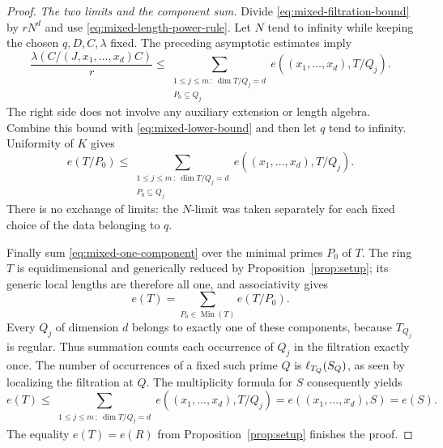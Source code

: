 \begin{proof}
\medskip
\noindent\emph{The two limits and the component sum.}
Divide \eqref{eq:mixed-filtration-bound} by $rN^d$ and use
\eqref{eq:mixed-length-power-rule}.  Let $N$ tend to infinity
while keeping the chosen $q,D,C,\lambda$ fixed.  The preceding
asymptotic estimates imply
\begin{equation}\label{eq:mixed-uniform-upper-bound}
 \frac{\lambda(C/(J,x_1,\ldots,x_d)C)}{r}
 \leq
 \sum_{\substack{1\leq j\leq m\,:\ \dim T/Q_j=d\\P_0\subseteq Q_j}}
       e((x_1,\ldots,x_d),T/Q_j).
\end{equation}
The right side does not involve any auxiliary extension or length
algebra.  Combine this bound with
\eqref{eq:mixed-lower-bound} and then let $q$ tend to infinity.
Uniformity of $K$ gives
\begin{equation}\label{eq:mixed-one-component}
 e(T/P_0)\leq
 \sum_{\substack{1\leq j\leq m\,:\ \dim T/Q_j=d\\P_0\subseteq Q_j}}
       e((x_1,\ldots,x_d),T/Q_j).
\end{equation}
There is no exchange of limits: the $N$-limit was taken separately
for each fixed choice of the data belonging to $q$.

Finally sum \eqref{eq:mixed-one-component} over the minimal primes
$P_0$ of $T$.  The ring $T$ is equidimensional and generically
reduced by Proposition~\ref{prop:setup}; its generic local lengths
are therefore all one, and associativity gives
\[
 e(T)=\sum_{P_0\in\operatorname{Min}(T)}e(T/P_0).
\]
Every $Q_j$ of dimension $d$ belongs to exactly one of these
components, because $T_{Q_j}$ is regular.  Thus summation counts
each occurrence of $Q_j$ in the filtration exactly once.  The
number of occurrences of a fixed such prime $Q$ is
$\operatorname{\ell}_{T_Q}(S_Q)$, as seen by localizing the filtration at $Q$.
The multiplicity formula for $S$ consequently yields
\[
 e(T)
 \leq\sum_{\substack{1\leq j\leq m\,:\ \dim T/Q_j=d}}
           e((x_1,\ldots,x_d),T/Q_j)
 =e((x_1,\ldots,x_d),S)=e(S).
\]
The equality $e(T)=e(R)$ from Proposition~\ref{prop:setup}
finishes the proof.
\end{proof}
